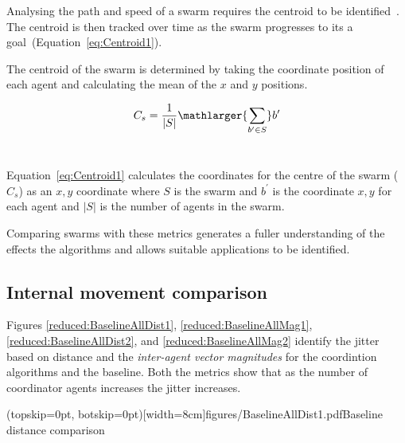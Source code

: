 \documentclass{ieeeaccess}
\begin{document}
Analysing the path and speed of a swarm requires the centroid to be identified~\cite{HAY:08,VG:05,GP:02,GP:04,GP:04a,GP:05,GP:11}. The centroid is then tracked over time as the swarm progresses to its a goal~(Equation~\ref{eq:Centroid1}).

The centroid of the swarm is determined by taking the coordinate position of each agent and calculating the mean of the $x$ and $y$ positions.

\begin{equation}\label{eq:Centroid1}
C_s = \frac{1}{|S|}\mathlarger{\sum_{b' \in S}} b'
\end{equation}‎

Equation~\ref{eq:Centroid1} calculates the coordinates for the centre of the swarm ($C_s$) as an $x,y$ coordinate where $S$ is the swarm and $b^{'}$ is the coordinate $x,y$ for each agent and $|S|$ is the number of agents in the swarm.

Comparing swarms with these metrics generates a fuller understanding of the effects the algorithms and allows suitable applications to be identified.

\subsection{Internal movement comparison\label{section:stabilityComparison1}}
Figures \ref{reduced:BaselineAllDist1}, \ref{reduced:BaselineAllMag1}, \ref{reduced:BaselineAllDist2}, and \ref{reduced:BaselineAllMag2} identify the jitter based on distance and the \textit{inter-agent vector magnitudes} for the coordintion algorithms and the baseline. Both the metrics show that as the number of coordinator agents increases the jitter increases. 


\Figure[t!](topskip=0pt, botskip=0pt)[width=8cm]{figures/BaselineAllDist1.pdf}{Baseline distance comparison\label{reduced:BaselineAllDist1}}

\end{document}
